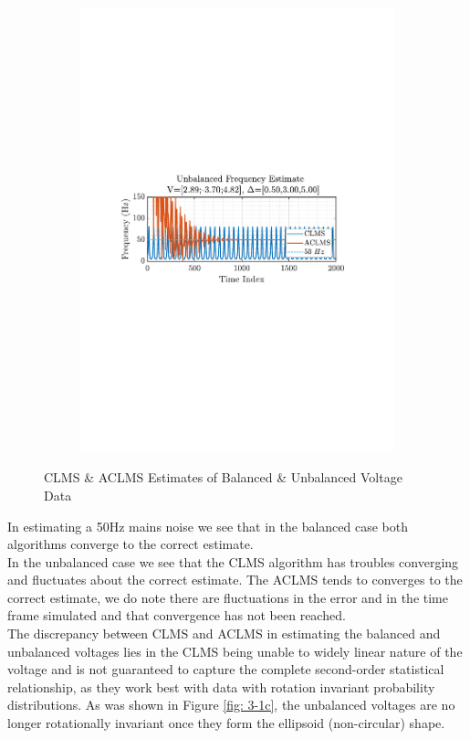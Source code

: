 \documentclass[12pt]{article}
\numberwithin{equation}{section}
\begin{document}
\begin{figure}[H]
\begin{subfigure}{0.49\textwidth}
					\includegraphics[trim={2.2cm 11.2cm 3.00cm  11.2cm}, clip, width=\textwidth]{../MATLAB/figures/q3_1e_fig04.pdf} 
					\captionsetup{justification=centering}
				\end{subfigure}
				
				\captionsetup{justification=centering}
				\caption{CLMS \& ACLMS Estimates of Balanced \& Unbalanced Voltage Data}
				\label{fig: 3-1e}
			\end{figure}
		
			In estimating a 50Hz mains noise we see that in the balanced case both algorithms converge to the correct estimate. \\
			In the unbalanced case we see that the CLMS algorithm has troubles converging and fluctuates about the correct estimate. The ACLMS tends to converges to the correct estimate, we do note there are fluctuations in the error and in the time frame simulated and that convergence has not been reached.\\
			The discrepancy between CLMS and ACLMS in estimating the balanced and unbalanced voltages lies in the CLMS being unable to widely linear nature of the voltage and is not guaranteed to capture the complete second-order statistical relationship, as they work best with data with rotation invariant probability distributions. As was shown in Figure \ref{fig: 3-1c}, the unbalanced voltages are no longer rotationally invariant once they form the ellipsoid (non-circular) shape.
\end{document}
